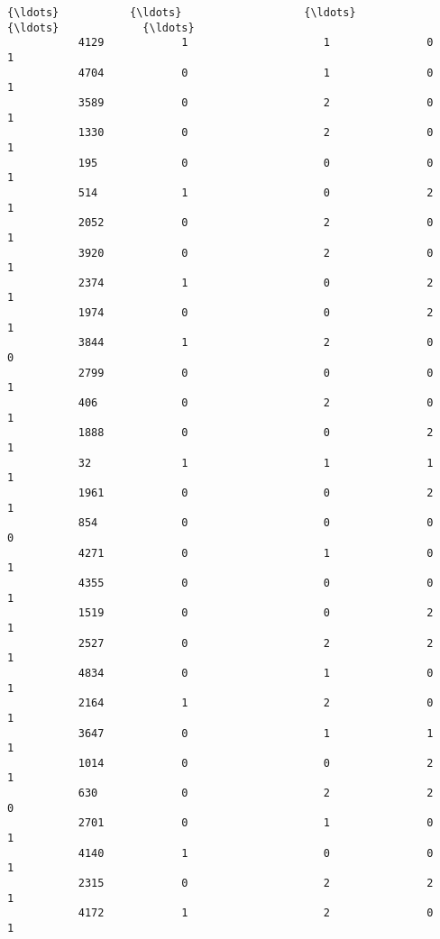 \documentclass[11pt]{article}
\begin{document}
\begin{Verbatim}[commandchars=\\\{\}]
           {\ldots}           {\ldots}                   {\ldots}             {\ldots}             {\ldots}   
           4129            1                     1               0               1   
           4704            0                     1               0               1   
           3589            0                     2               0               1   
           1330            0                     2               0               1   
           195             0                     0               0               1   
           514             1                     0               2               1   
           2052            0                     2               0               1   
           3920            0                     2               0               1   
           2374            1                     0               2               1   
           1974            0                     0               2               1   
           3844            1                     2               0               0   
           2799            0                     0               0               1   
           406             0                     2               0               1   
           1888            0                     0               2               1   
           32              1                     1               1               1   
           1961            0                     0               2               1   
           854             0                     0               0               0   
           4271            0                     1               0               1   
           4355            0                     0               0               1   
           1519            0                     0               2               1   
           2527            0                     2               2               1   
           4834            0                     1               0               1   
           2164            1                     2               0               1   
           3647            0                     1               1               1   
           1014            0                     0               2               1   
           630             0                     2               2               0   
           2701            0                     1               0               1   
           4140            1                     0               0               1   
           2315            0                     2               2               1   
           4172            1                     2               0               1   
           

\end{Verbatim}
\end{document}
